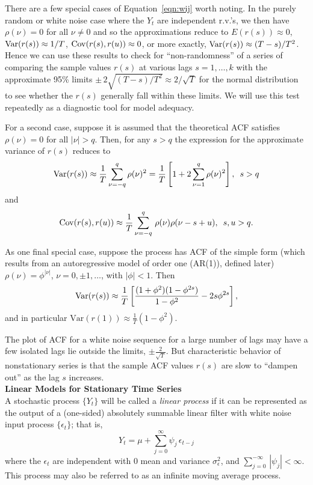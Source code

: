 There are a few special cases of Equation~\ref{eqn:wij} worth noting. In the purely random or white noise case where the $Y_t$ are independent r.v.'s, we then have $\rho(\nu)=0$ for all $\nu \neq 0$ and so the approximations reduce to $E(r(s)) \approx 0$, $\operatorname{Var}(r(s)) \approx 1/T$, $\operatorname{Cov}(r(s), r(u)) \approx 0$, or more exactly, $\operatorname{Var}(r(s)) \approx (T-s)/T^2$. Hence we can use these results to check for ``non-randomness'' of a series of comparing the sample values $r(s)$ at various lags $s=1, \ldots, k$ with the approximate 95\% limits $\pm \, 2 \sqrt{(T-s)/T^2} \approx 2 / \sqrt{T}$ for the normal distribution to see whether the $r(s)$ generally fall within these limits. We will use this test repeatedly as a diagnostic tool for model adequacy. 


For a second case, suppose it is assumed that the theoretical ACF satisfies $\rho(\nu) = 0$ for all $|\nu| > q$.  Then, for any $s>q$ the expression for the approximate variance of $r(s)$ reduces to
	\begin{equation}\label{eqn:varrs}
	\Var(r(s)) \approx \dfrac{1}{T} \sum_{\nu=-q}^q \rho(\nu)^2= \dfrac{1}{T} \left[ 1+ 2 \sum_{\nu=1}^q \rho(\nu)^2 \right], \enskip s>q 
	\end{equation}        
and
	\[
	\operatorname{Cov}(r(s), r(u))\approx \frac{1}{T} \sum_{\nu = -q}^{q} \, \rho(\nu) \rho(\nu -s+u),\enskip s, u > q.
	 \]

As one final special case, suppose the process  has ACF of the simple form (which results from an autoregressive model of order one (AR(1)), defined later) $\rho(\nu) = \phi^{|\nu|}$, $\nu=0, \pm 1, \ldots$, with $|\phi| < 1$. Then
	\[
	\operatorname{Var}(r(s)) \approx \frac{1}{T} \left[\frac{(1+\phi^2)(1-\phi^{2s})}{1-\phi^2} - 2s\phi^{2s}\right],
	\]
and in particular $\text{Var}(r(1)) \approx \frac{1}{T} (1-\phi^2)$.


The plot of ACF for a white noise sequence for a large number of lags may have a few isolated lags lie outside the limits, $\pm \frac{2}{\sqrt{T}}$. But characteristic behavior of nonstationary series is that the sample ACF values $r(s)$ are slow to ``dampen out'' as the lag $s$ increases. \\


\noindent\textbf{Linear Models for Stationary Time Series} \\


A stochastic process $\{Y_t\}$ will be called a \textit{linear process} if it can be represented as the output of a (one-sided) absolutely summable linear filter with white noise input process $\{\epsilon_t\}$; that is,
	\begin{equation}\label{eqn:yt}
          Y_t = \mu + \sum_{j=0}^{\infty}  \psi_j \,  \epsilon_{t-j}
	\end{equation}
where the $\epsilon_t$ are independent with 0 mean and variance $\sigma^2_{\epsilon}$, and $\sum_{j=0}^{-\infty} \, |\psi_j | < \infty$. This process may also be referred to as an infinite moving average process.


